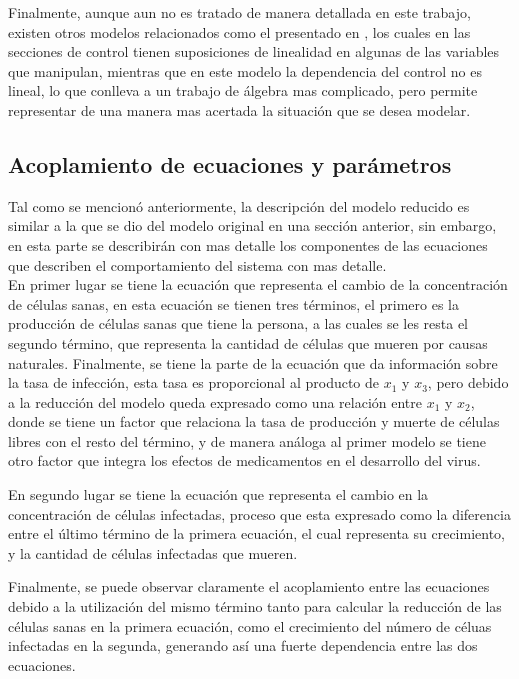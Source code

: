 \documentclass{article}
\begin{document}
    Finalmente, aunque aun no es tratado de manera detallada en este trabajo,
    existen otros modelos relacionados como el presentado en \cite{ieee4},
    los cuales en las secciones de control tienen suposiciones de linealidad en
    algunas de las variables que manipulan, mientras que en este modelo la
    dependencia del control no es lineal, lo que conlleva a un trabajo de álgebra
    mas complicado, pero permite representar de una manera mas acertada la
    situación que se desea modelar.\\

    \subsection{Acoplamiento de ecuaciones y parámetros}

    Tal como se mencionó anteriormente, la descripción del modelo reducido es
    similar a la que se dio del modelo original en una sección anterior, sin
    embargo, en esta parte se describirán con mas detalle los componentes de las
    ecuaciones que describen el comportamiento del sistema con mas detalle.\\

    En primer lugar se tiene la ecuación que representa el cambio de la
    concentración de células sanas, en esta ecuación se tienen tres términos,
    el primero es la producción de células sanas que tiene la persona, a las
    cuales se les resta el segundo término, que representa la cantidad de
    células que mueren por causas naturales. Finalmente, se tiene la parte de la
    ecuación que da información sobre la tasa de infección, esta tasa es
    proporcional al producto de $x_1$ y $x_3$, pero debido a la reducción del
    modelo queda expresado como una relación entre $x_1$ y $x_2$, donde se
    tiene un factor que relaciona la tasa de producción y muerte de células
    libres con el resto del término, y de manera análoga al primer modelo se
    tiene otro factor que integra los efectos de medicamentos en el desarrollo
    del virus.

    En segundo lugar se tiene la ecuación que representa el cambio en la concentración
    de células infectadas, proceso que esta expresado como la diferencia entre el
    último término de la primera ecuación, el cual representa su crecimiento, y
    la cantidad de células infectadas que mueren.

    Finalmente, se puede observar claramente el acoplamiento entre las ecuaciones
    debido a la utilización del mismo término tanto para calcular la reducción de las
    células sanas en la primera ecuación, como el crecimiento del número
    de céluas infectadas en la segunda, generando así una fuerte dependencia entre
    las dos ecuaciones.
\end{document}
